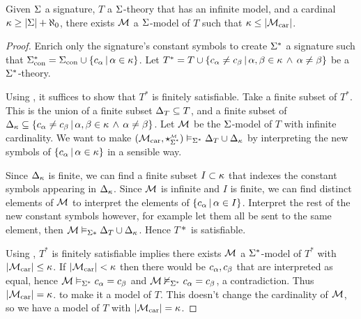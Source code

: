 \begin{prop}
    Given $\Sigma$ a signature, 
    $T$ a $\Sigma$-theory that has an infinite model,
    and a cardinal $\kappa \geq |\Sigma| + \aleph_0$, 
    there exists $\mathcal{M}$ a $\Sigma$-model of $T$ such that 
    $\kappa \leq |\mathcal{M}_\mathrm{car}|$.
\end{prop}
\begin{proof}
    Enrich only the signature's constant symbols to create $\Sigma^*$ 
    a signature such that 
    $\Sigma^*_\mathrm{con} = \Sigma_\mathrm{con} \cup \left\{c_\alpha \,|\, \alpha \in \kappa\right\}$.
    Let $T^* = T \cup \left\{c_\alpha \neq c_\beta \,|\, \alpha,\beta \in \kappa \, \land \, \alpha \ne \beta\right\}$
    be a $\Sigma^*$-theory.
    
    Using , 
    it suffices to show that $T^*$ is finitely satisfiable.
    Take a finite subset of $T^*$. 
    This is the union of a finite subset $\Delta_T \subseteq T$, 
    and a finite subset of 
    $\Delta_{\kappa} \subseteq 
    \left\{c_\alpha \neq c_\beta \,|\, \alpha,\beta \in \kappa \, \land \, \alpha \ne \beta\right\}$.
    Let $\mathcal{M}$ be the $\Sigma$-model of $T$ with infinite cardinality.
    We want to make 
    $(\carrier{\MM},\intp{\Si^*}{\MM}) \model{\Si^*} \De_T \cup \De_\ka$ 
    by interpreting the new symbols of $\left\{c_\alpha \,|\, \alpha \in \kappa\right\}$
    in a sensible way.
    
    Since $\Delta_\kappa$ is finite, we can find a finite subset $I \subset \kappa$ that indexes the constant symbols appearing in $\Delta_\kappa$. 
    Since $\mathcal{M}$ is infinite and $I$ is finite,
    we can find distinct elements of $\mathcal{M}$
    to interpret the elements of
    $\left\{c_\alpha \,|\, \alpha \in I\right\}$. 
    Interpret the rest of the new constant symbols however,
    for example let them all be sent to the same element,
    then $\mathcal{M} \vDash_{\Sigma*} \Delta_T \cup \Delta_\kappa$.
    Hence $T*$ is satisfiable.
    
    Using 
    ,
    $T^*$ is finitely satisfiable implies there exists
    $\mathcal{M}$ a $\Sigma^*$-model of $T^*$ with $|\mathcal{M}_\mathrm{car}|\leq \kappa$.
    If $|\mathcal{M}_\mathrm{car}| < \kappa$ 
    then there would be $c_\alpha, c_\beta$ that are interpreted as equal,
    hence $\mathcal{M} \vDash_{\Sigma^*} c_\alpha = c_\beta$ and $\mathcal{M} \nvDash_{\Sigma^*} c_\alpha = c_\beta$, 
    a contradiction.
    Thus $|\mathcal{M}_\mathrm{car}| = \kappa$.
    to make it a model of $T$.
    This doesn't change the cardinality of $\mathcal{M}$,
    so we have a model of $T$ with $|\mathcal{M}_\mathrm{car}| = \kappa$.
\end{proof}